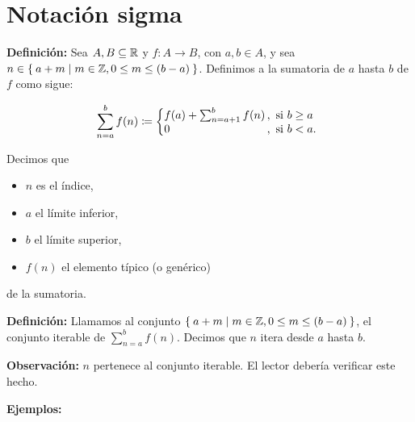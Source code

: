 \part*{Notación sigma}

\textbf{Definición:} Sea $A, B\subseteq \mathbb{R}$ y $f:A \to B$, con $a,b\in A$, y sea $n \in \Set{a + m | m\in \mathbb{Z}, 0\leq m \leq (b-a)}$. Definimos a la sumatoria de $a$ hasta $b$ de $f$ como sigue:

\[
    \sum_{n=a}^{b} f(n) \defined \left\{
    \begin{array}{@{}l@{\thinspace}l}
    f(a) + \sum_{n=a+1}^{b} f(n) &,  \ \text{si}  \ b\geq a\\
    0 &,  \ \text{si}  \ b<a.
    \end{array} \right. \]

Decimos que
\begin{itemize}
  \item $n$ es el índice,
  \item $a$ el límite inferior,
  \item $b$ el límite superior,
  \item $f(n)$ el elemento típico (o genérico)
\end{itemize}
de la sumatoria.

\textbf{Definición:} Llamamos al conjunto $\Set{a + m | m\in \mathbb{Z}, 0\leq m \leq (b-a)}$, el conjunto iterable de $\sum_{n=a}^{b} f(n)$. Decimos que $n$ itera desde $a$ hasta $b$.

\textbf{Observación:} $n$ pertenece al conjunto iterable. El lector debería verificar este hecho.

\textbf{Ejemplos:}

